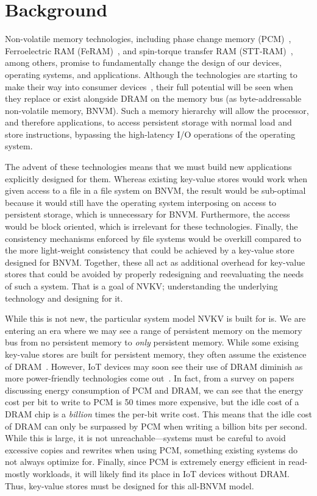 \section{Background}

Non-volatile memory technologies, including phase change memory
(PCM)~\cite{lee_architecting_2009,wong2010phase}, Ferroelectric RAM
(FeRAM)~\cite{fox:2001feram}, and spin-torque transfer RAM (STT-RAM)~\cite{sttram},
among others, promise to fundamentally change the design of our
devices, operating systems, and applications. Although the technologies are
starting to make their way into consumer devices~\cite{intel3dxpoint}, their
full potential will be seen when they replace or exist alongside DRAM on the
memory bus (as byte-addressable non-volatile memory, BNVM).
Such a memory hierarchy will allow the processor, and therefore
applications, to access persistent storage with normal load and store
instructions, bypassing the high-latency I/O operations of the operating system.

The advent of these technologies means that we must build new applications
explicitly designed for them. Whereas existing key-value stores would work when
given access to a file in a file system on BNVM, the result would be sub-optimal
because it would still have the operating system interposing on access to
persistent storage, which is unnecessary for BNVM. Furthermore, the access would
be block oriented, which is irrelevant for these technologies. Finally, the
consistency mechanisms enforced by file systems would be overkill compared to
the more light-weight consistency that could be achieved by a key-value store
designed for BNVM. Together, these all act as additional overhead for key-value
stores that could be avoided by properly redesigning and reevaluating the needs
of such a system. That is a goal of NVKV; understanding the underlying
technology and designing for it.

While this is not new, the particular system model NVKV is built for is. We are
entering an era where we may see a range of persistent memory on the memory bus
from no persistent memory to \textit{only} persistent memory. While some exising
key-value stores are built for persistent memory, they often assume the
existence of DRAM~\cite{echo,Arulraj:2016wbl}. However, IoT devices may soon see
their use of DRAM diminish as more power-friendly technologies come
out~\cite{Jayakumar2014powering}. In fact, from a survey on
papers~\cite{dhiman_pdram:_2009,lee_architecting_2009,xiangyu_dong_nvsim:_2012,qureshi_scalable_2009,Chen_rethinkingdatabase,bedeschi_8mb_2004} discussing
energy consumption of PCM and DRAM, we can see that the energy cost per bit to
write to PCM is 50 times more expensive, but
the idle cost of a DRAM chip is a \textit{billion} times the per-bit write cost. This
means that the idle cost of DRAM can only be surpassed by PCM when writing a
billion bits per second. While this is large, it is not unreachable---systems
must be careful to avoid excessive copies and rewrites when using PCM, something 
existing systems do not always optimize for. Finally, since PCM is
extremely energy efficient in read-mostly workloads, it will likely find its
place in IoT devices without DRAM. Thus, key-value stores must be designed for
this all-BNVM model.

